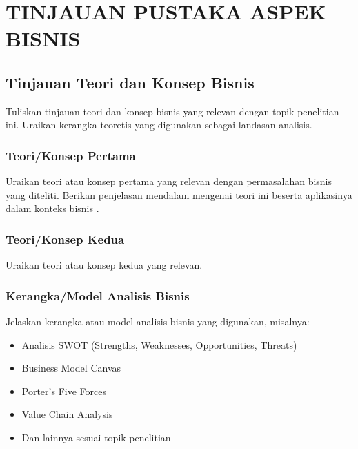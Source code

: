 
\chapter{TINJAUAN PUSTAKA ASPEK BISNIS}
\label{bab:tinjauan-bisnis}

\section{Tinjauan Teori dan Konsep Bisnis}
\label{sec:tinjauan-teori-bisnis}

Tuliskan tinjauan teori dan konsep bisnis yang relevan dengan topik penelitian ini.
Uraikan kerangka teoretis yang digunakan sebagai landasan analisis.

\subsection{Teori/Konsep Pertama}
\label{subsec:konsep-pertama}

Uraikan teori atau konsep pertama yang relevan dengan permasalahan bisnis yang diteliti.
Berikan penjelasan mendalam mengenai teori ini beserta aplikasinya dalam konteks
bisnis \cite{contohSumber2025}.

\subsection{Teori/Konsep Kedua}
\label{subsec:konsep-kedua}

Uraikan teori atau konsep kedua yang relevan.

\subsection{Kerangka/Model Analisis Bisnis}
\label{subsec:model-analisis}

Jelaskan kerangka atau model analisis bisnis yang digunakan, misalnya:
\begin{itemize}
  \item Analisis SWOT (Strengths, Weaknesses, Opportunities, Threats)
  \item Business Model Canvas
  \item Porter's Five Forces
  \item Value Chain Analysis
  \item Dan lainnya sesuai topik penelitian
\end{itemize}

